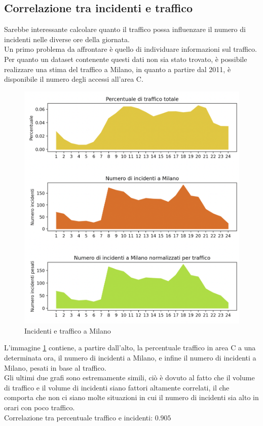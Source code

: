 \documentclass[a4paper]{report}
\begin{document}
\subsection{Correlazione tra incidenti e traffico}

Sarebbe interessante calcolare quanto il traffico possa influenzare il numero di incidenti 
nelle diverse ore della giornata. \\
Un primo problema da affrontare è quello di individuare informazioni sul traffico. 
Per quanto un dataset contenente questi dati non sia stato trovato, 
è possibile realizzare una stima del traffico a Milano, 
in quanto a partire dal 2011, è disponibile il numero degli accessi all'area C.

\begin{figure}
    \includegraphics[width=\linewidth]{../src/area_c/incidenti_traffico_ora.png}
    \caption{Incidenti e traffico a Milano}
    \label{fig:incidenti-traffico-ora}
\end{figure}

L'immagine \ref{fig:incidenti-traffico-ora} contiene, a partire dall'alto, 
la percentuale traffico in area C a una determinata ora, il numero di incidenti a Milano, 
e infine il numero di incidenti a Milano, pesati in base al traffico.\\
Gli ultimi due grafi sono estremamente simili, ciò è dovuto al fatto che il volume di traffico e 
il volume di incidenti siano fattori altamente correlati, il che comporta che non ci siano molte 
situazioni in cui il numero di incidenti sia alto in orari con poco traffico.\\
Correlazione tra percentuale traffico e incidenti: $0.905$
\end{document}
